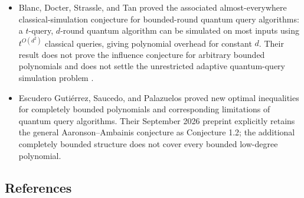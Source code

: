 \begin{itemize}
  \item Blanc, Docter, Strassle, and Tan proved the associated almost-everywhere
classical-simulation conjecture for bounded-round quantum query algorithms:
a $t$-query, $d$-round quantum algorithm can be simulated on most inputs
using $t^{O(d^2)}$ classical queries, giving polynomial overhead for
constant $d$.  Their result does not prove the influence conjecture for
arbitrary bounded polynomials and does not settle the unrestricted adaptive
quantum-query simulation problem
.

  \item Escudero Guti\'errez, Saucedo, and Palazuelos proved new optimal inequalities for completely bounded polynomials and corresponding limitations of quantum query algorithms. Their September 2026 preprint explicitly retains the general Aaronson--Ambainis conjecture as Conjecture 1.2; the additional completely bounded structure does not cover every bounded low-degree polynomial. 
\end{itemize}

\subsection*{References}

